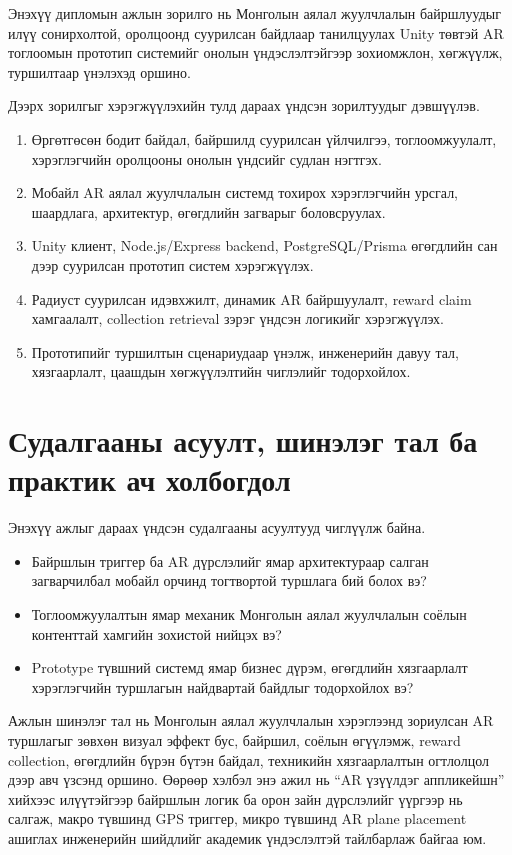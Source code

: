 \begin{sloppy}
Энэхүү дипломын ажлын зорилго нь Монголын аялал жуулчлалын байршлуудыг илүү сонирхолтой, оролцоонд суурилсан байдлаар танилцуулах Unity төвтэй AR тоглоомын прототип системийг онолын үндэслэлтэйгээр зохиомжлон, хөгжүүлж, туршилтаар үнэлэхэд оршино.

Дээрх зорилгыг хэрэгжүүлэхийн тулд дараах үндсэн зорилтуудыг дэвшүүлэв.

\begin{enumerate}
    \item Өргөтгөсөн бодит байдал, байршилд суурилсан үйлчилгээ, тоглоомжуулалт, хэрэглэгчийн оролцооны онолын үндсийг судлан нэгтгэх.
    \item Мобайл AR аялал жуулчлалын системд тохирох хэрэглэгчийн урсгал, шаардлага, архитектур, өгөгдлийн загварыг боловсруулах.
    \item Unity клиент, Node.js/Express backend, PostgreSQL/Prisma өгөгдлийн сан дээр суурилсан прототип систем хэрэгжүүлэх.
    \item Радиуст суурилсан идэвхжилт, динамик AR байршуулалт, reward claim хамгаалалт, collection retrieval зэрэг үндсэн логикийг хэрэгжүүлэх.
    \item Прототипийг туршилтын сценариудаар үнэлж, инженерийн давуу тал, хязгаарлалт, цаашдын хөгжүүлэлтийн чиглэлийг тодорхойлох.
\end{enumerate}

\section{Судалгааны асуулт, шинэлэг тал ба практик ач холбогдол}

Энэхүү ажлыг дараах үндсэн судалгааны асуултууд чиглүүлж байна.

\begin{itemize}
    \item Байршлын триггер ба AR дүрслэлийг ямар архитектураар салган загварчилбал мобайл орчинд тогтвортой туршлага бий болох вэ?
    \item Тоглоомжуулалтын ямар механик Монголын аялал жуулчлалын соёлын контенттай хамгийн зохистой нийцэх вэ?
    \item Prototype түвшний системд ямар бизнес дүрэм, өгөгдлийн хязгаарлалт хэрэглэгчийн туршлагын найдвартай байдлыг тодорхойлох вэ?
\end{itemize}

Ажлын шинэлэг тал нь Монголын аялал жуулчлалын хэрэглээнд зориулсан AR туршлагыг зөвхөн визуал эффект бус, байршил, соёлын өгүүлэмж, reward collection, өгөгдлийн бүрэн бүтэн байдал, техникийн хязгаарлалтын огтлолцол дээр авч үзсэнд оршино. Өөрөөр хэлбэл энэ ажил нь ``AR үзүүлдэг аппликейшн'' хийхээс илүүтэйгээр байршлын логик ба орон зайн дүрслэлийг үүргээр нь салгаж, макро түвшинд GPS триггер, микро түвшинд AR plane placement ашиглах инженерийн шийдлийг академик үндэслэлтэй тайлбарлаж байгаа юм.


\end{sloppy}
